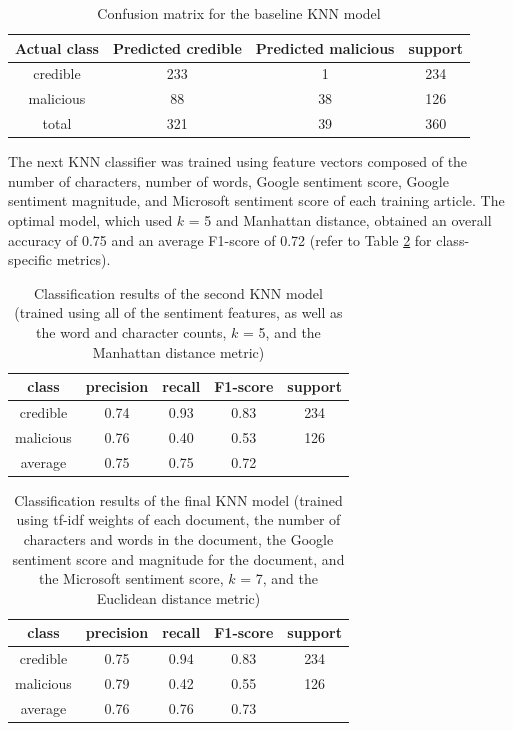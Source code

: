 \begin{table}[h!]
\centering
\begin{tabular}{|c | c  c | c|}
\hline
                Actual class & 
                Predicted credible 
                &   
                Predicted malicious
                & support\\
\hline
credible   & 233                & 1                   & 234\\
malicious  & 88                 & 38                  & 126\\
\hline
total      & 321                & 39                  & 360\\
\hline
\end{tabular}
\caption[Baseline KNN's Confusion Matrix]{Confusion matrix for the baseline KNN model}
\label{table:baselineKNNConfusion}
\end{table}


The next KNN classifier was trained using feature vectors composed of the number of characters, number of words, Google sentiment score, Google sentiment magnitude, and Microsoft sentiment score of each training article.  The optimal model, which used $k$ = 5 and Manhattan distance, obtained an overall accuracy of 0.75 and an average F1-score of 0.72 (refer to Table \ref{table:secondKNN} for class-specific metrics).


\begin{table}[h]
\centering
\begin{tabular}{|c | c  c  c | c|}
\hline
class      & precision & recall & F1-score & support\\
\hline
credible   & 0.74      & 0.93   & 0.83     & 234    \\
malicious  & 0.76      & 0.40   & 0.53     & 126    \\
\hline
average    & 0.75      & 0.75   & 0.72     &   \\
\hline
\end{tabular}
\caption[Second KNN's Classification Report]{Classification results of the second KNN model (trained using all of the sentiment features, as well as the word and character counts, $k$ = 5, and the Manhattan distance metric)}
\label{table:secondKNN}
\end{table}


\begin{table}[h!]
\centering
\begin{tabular}{|c | c  c  c | c|}
\hline
class      & precision & recall & F1-score & support\\
\hline
credible   & 0.75      & 0.94   & 0.83     & 234    \\
malicious  & 0.79      & 0.42   & 0.55     & 126    \\
\hline
average    & 0.76      & 0.76   & 0.73     &   \\
\hline
\end{tabular}
\caption[Final KNN's Classification Report]{Classification results of the final KNN model (trained using tf-idf weights of each document, the number of characters and words in the document, the Google sentiment score and magnitude for the document, and the Microsoft sentiment score, $k$ = 7, and the Euclidean distance metric)}
\label{table:lastKNN}
\end{table}


